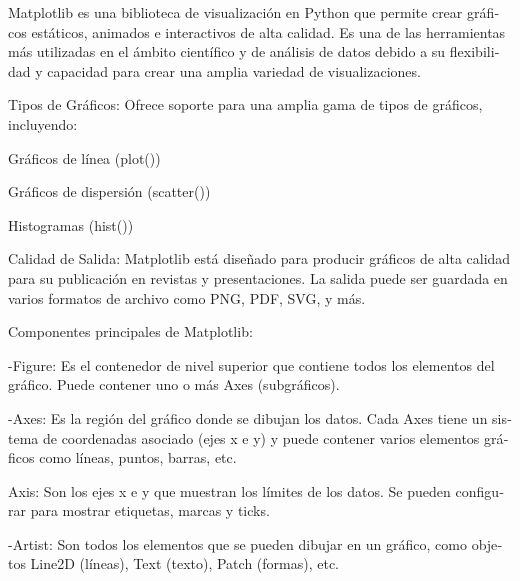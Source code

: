 \documentclass[letterpaper]{article}
\begin{document}
{
\foreignlanguage{spanish}{Matplotlib es una biblioteca de visualización en Python que permite crear gráficos estáticos,
animados e interactivos de alta calidad. Es una de las herramientas más utilizadas en el ámbito científico y de
análisis de datos debido a su flexibilidad y capacidad para crear una amplia variedad de visualizaciones.}}

{
\foreignlanguage{spanish}{Tipos de Gráficos: Ofrece soporte para una amplia gama de tipos de gráficos, incluyendo:}}

{
\foreignlanguage{spanish}{Gráficos de línea (plot())}}

{
\foreignlanguage{spanish}{Gráficos de dispersión (scatter())}}

{
\foreignlanguage{spanish}{Histogramas (hist())}}


\bigskip

{
\foreignlanguage{spanish}{Calidad de Salida: Matplotlib está diseñado para producir gráficos de alta calidad para su
publicación en revistas y presentaciones. La salida puede ser guardada en varios formatos de archivo como PNG, PDF,
SVG, y más.}}

{
\foreignlanguage{spanish}{Componentes principales de Matplotlib:}}

{
\foreignlanguage{spanish}{{}-Figure: Es el contenedor de nivel superior que contiene todos los elementos del gráfico.
Puede contener uno o más Axes (subgráficos).}}

{
\foreignlanguage{spanish}{{}-Axes: Es la región del gráfico donde se dibujan los datos. Cada Axes tiene un sistema de
coordenadas asociado (ejes x e y) y puede contener varios elementos gráficos como líneas, puntos, barras, etc.}}

{
\foreignlanguage{spanish}{Axis: Son los ejes x e y que muestran los límites de los datos. Se pueden configurar para
mostrar etiquetas, marcas y ticks.}}

{
\foreignlanguage{spanish}{{}-Artist: Son todos los elementos que se pueden dibujar en un gráfico, como objetos Line2D
(líneas), Text (texto), Patch (formas), etc.}}


\bigskip


\bigskip


\bigskip


\bigskip
\end{document}
